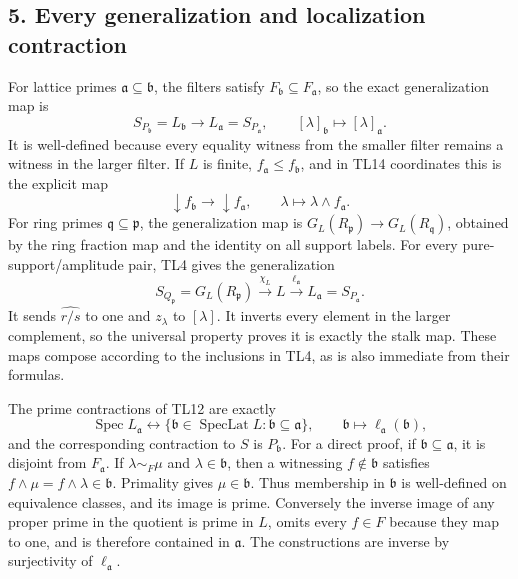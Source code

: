 \documentclass[11pt,a4paper]{article}
\theoremstyle{definition}\newtheorem{definition}[theorem]{Definition}
\begin{document}
\subsection{5. Every generalization and localization
contraction}\label{every-generalization-and-localization-contraction}

For lattice primes \(\mathfrak a\subseteq\mathfrak b\), the filters
satisfy \(F_{\mathfrak b}\subseteq F_{\mathfrak a}\), so the exact
generalization map is \[
 S_{P_{\mathfrak b}}=L_{\mathfrak b}\longrightarrow L_{\mathfrak a}=S_{P_{\mathfrak a}},
 \qquad[\lambda]_{\mathfrak b}\mapsto[\lambda]_{\mathfrak a}.
 \tag{TL19}
\] It is well-defined because every equality witness from the smaller
filter remains a witness in the larger filter. If \(L\) is finite,
\(f_{\mathfrak a}\le f_{\mathfrak b}\), and in TL14 coordinates this is
the explicit map \[
 \downarrow f_{\mathfrak b}\longrightarrow\downarrow f_{\mathfrak a},
 \qquad\lambda\mapsto\lambda\wedge f_{\mathfrak a}.
 \tag{TL20}
\] For ring primes \(\mathfrak q\subseteq\mathfrak p\), the
generalization map is \(G_L(R_{\mathfrak p})\to G_L(R_{\mathfrak q})\),
obtained by the ring fraction map and the identity on all support
labels. For every pure-support/amplitude pair, TL4 gives the
generalization \[
 S_{Q_{\mathfrak p}}=G_L(R_{\mathfrak p})
 \xrightarrow{\chi_L}L\xrightarrow{\ell_{\mathfrak a}}L_{\mathfrak a}=S_{P_{\mathfrak a}}.
 \tag{TL21}
\] It sends \(\widehat{r/s}\) to one and \(z_\lambda\) to \([\lambda]\).
It inverts every element in the larger complement, so the universal
property proves it is exactly the stalk map. These maps compose
according to the inclusions in TL4, as is also immediate from their
formulas.

The prime contractions of TL12 are exactly \[
 \operatorname{Spec}L_{\mathfrak a}\longleftrightarrow
 \{\mathfrak b\in\operatorname{SpecLat}L:\mathfrak b\subseteq\mathfrak a\},
 \qquad \mathfrak b\longmapsto\ell_{\mathfrak a}(\mathfrak b),
 \tag{TL22}
\] and the corresponding contraction to \(S\) is \(P_{\mathfrak b}\).
For a direct proof, if \(\mathfrak b\subseteq\mathfrak a\), it is
disjoint from \(F_{\mathfrak a}\). If \(\lambda\sim_F\mu\) and
\(\lambda\in\mathfrak b\), then a witnessing \(f\notin\mathfrak b\)
satisfies \(f\wedge\mu=f\wedge\lambda\in\mathfrak b\). Primality gives
\(\mu\in\mathfrak b\). Thus membership in \(\mathfrak b\) is
well-defined on equivalence classes, and its image is prime. Conversely
the inverse image of any proper prime in the quotient is prime in \(L\),
omits every \(f\in F\) because they map to one, and is therefore
contained in \(\mathfrak a\). The constructions are inverse by
surjectivity of \(\ell_{\mathfrak a}\).
\end{document}
